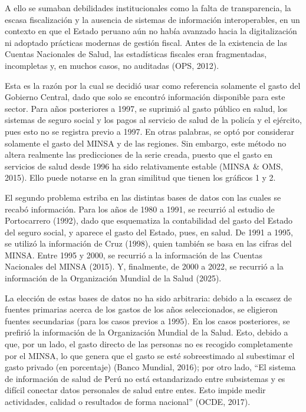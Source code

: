 \documentclass[12pt]{article}
\begin{document}
A ello se sumaban debilidades institucionales como la falta de transparencia, la escasa fiscalización y la ausencia de sistemas de información interoperables, en un contexto en que el Estado peruano aún no había avanzado hacia la digitalización ni adoptado prácticas modernas de gestión fiscal. Antes de la existencia de las Cuentas Nacionales de Salud, las estadísticas fiscales eran fragmentadas, incompletas y, en muchos casos, no auditadas (OPS, 2012). 

Esta es la razón por la cual se decidió usar como referencia solamente el gasto del Gobierno Central, dado que solo se encontró información disponible para este sector. Para años posteriores a 1997, se suprimió al gasto público en salud, los sistemas de seguro social y los pagos al servicio de salud de la policía y el ejército, pues esto no se registra previo a 1997. En otras palabras, se optó por considerar solamente el gasto del MINSA y de las regiones. Sin embargo, este método no altera realmente las predicciones de la serie creada, puesto que el gasto en servicios de salud desde 1996 ha sido relativamente estable (MINSA \& OMS, 2015). Ello puede notarse en la gran similitud que tienen los gráficos 1 y 2. 

El segundo problema estriba en las distintas bases de datos con las cuales se recabó información. Para los años de 1980 a 1991, se recurrió al estudio de Portocarrero (1992), dado que esquematiza la contabilidad del gasto del Estado del seguro social, y aparece el gasto del Estado, pues, en salud. De 1991 a 1995, se utilizó la información de Cruz (1998), quien también se basa en las cifras del MINSA. Entre 1995 y 2000, se recurrió a la información de las Cuentas Nacionales del MINSA (2015). Y, finalmente, de 2000 a 2022, se recurrió a la información de la Organización Mundial de la Salud (2025). 

La elección de estas bases de datos no ha sido arbitraria: debido a la escasez de fuentes primarias acerca de los gastos de los años seleccionados, se eligieron fuentes secundarias (para los casos previos a 1995). En los casos posteriores, se prefirió la información de la Organización Mundial de la Salud. Esto, debido a que, por un lado, el gasto directo de las personas no es recogido completamente por el MINSA, lo que genera que el gasto se esté sobreestimado al subestimar el gasto privado (en porcentaje) (Banco Mundial, 2016); por otro lado, “El sistema de información de salud de Perú no está estandarizado entre subsistemas y es difícil conectar datos personales de salud entre entes. Esto impide medir actividades, calidad o resultados de forma nacional” (OCDE, 2017). 
\end{document}
